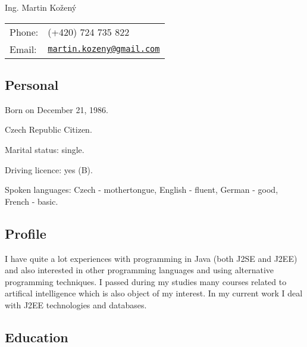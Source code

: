 \documentclass[czech]{article}
\def\name{Ing. Martin Kožený}
\renewenvironment{itemize}{
  \begin{list}{}{
    \setlength{\leftmargin}{1.5em}
  }
}{
  \end{list}
}
\begin{document}
{\huge \name}


\vspace{0.25in}

\begin{minipage}{0.45\linewidth}
  \begin{tabular}{ll}
    Phone: & (+420) 724 735 822 \\
    Email: & \href{mailto:martin.kozeny@gmail.com}{\tt martin.kozeny@gmail.com}
    \\
  \end{tabular}
\end{minipage}

\textcolor{coolblack}{\section*{Personal}}

\begin{itemize}
\item Born on December 21, 1986.
\item Czech Republic Citizen.
\item Marital status: single.
\item Driving licence: yes (B).
\item Spoken languages: Czech - mothertongue, English - fluent, German - good,
French - basic.
\end{itemize}

\textcolor{coolblack}{\section*{Profile}}
I have quite a lot experiences with programming in Java (both J2SE and J2EE)
and also interested in other programming languages and using alternative
programming techniques. I passed during my studies many courses related to
artifical intelligence which is also object of my interest. In my current work I
deal with J2EE technologies and databases.

\textcolor{coolblack}{\section*{Education}}
\end{document}
